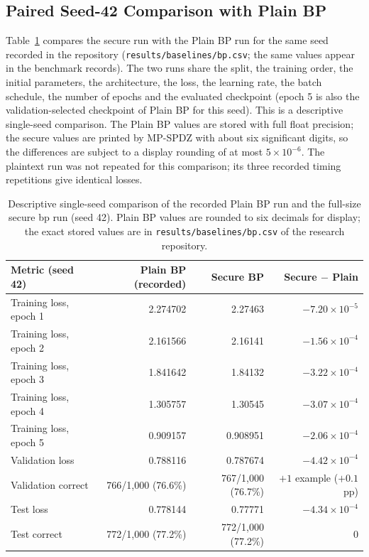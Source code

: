 \FloatBarrier
\subsection{Paired Seed-42 Comparison with Plain BP}\label{sec:res-paired}
Table~\ref{tab:res-paired} compares the secure run with the Plain BP run for the same seed recorded in the repository (\texttt{results/baselines/bp.csv}; the same values appear in the benchmark records). The two runs share the split, the training order, the initial parameters, the architecture, the loss, the learning rate, the batch schedule, the number of epochs and the evaluated checkpoint (epoch 5 is also the validation-selected checkpoint of Plain BP for this seed). This is a descriptive single-seed comparison. The Plain BP values are stored with full float precision; the secure values are printed by MP-SPDZ with about six significant digits, so the differences are subject to a display rounding of at most $5\times10^{-6}$. The plaintext run was not repeated for this comparison; its three recorded timing repetitions give identical losses.

\begin{table}[htbp]
\centering
\small
\begin{tabular}{@{}lrrr@{}}
\toprule
Metric (seed 42) & Plain BP (recorded) & Secure BP & Secure $-$ Plain \\
\midrule
Training loss, epoch 1 & 2.274702 & 2.27463 & $-7.20\times10^{-5}$ \\
Training loss, epoch 2 & 2.161566 & 2.16141 & $-1.56\times10^{-4}$ \\
Training loss, epoch 3 & 1.841642 & 1.84132 & $-3.22\times10^{-4}$ \\
Training loss, epoch 4 & 1.305757 & 1.30545 & $-3.07\times10^{-4}$ \\
Training loss, epoch 5 & 0.909157 & 0.908951 & $-2.06\times10^{-4}$ \\
Validation loss & 0.788116 & 0.787674 & $-4.42\times10^{-4}$ \\
Validation correct & 766/1{,}000 (76.6\%) & 767/1{,}000 (76.7\%) & $+1$ example ($+0.1$ pp) \\
Test loss & 0.778144 & 0.77771 & $-4.34\times10^{-4}$ \\
Test correct & 772/1{,}000 (77.2\%) & 772/1{,}000 (77.2\%) & 0 \\
\bottomrule
\end{tabular}
\caption{Descriptive single-seed comparison of the recorded Plain BP run and the full-size secure \ac{bp} run (seed 42). Plain BP values are rounded to six decimals for display; the exact stored values are in \texttt{results/\allowbreak baselines/\allowbreak bp.csv} of the research repository.}
\label{tab:res-paired}
\end{table}

